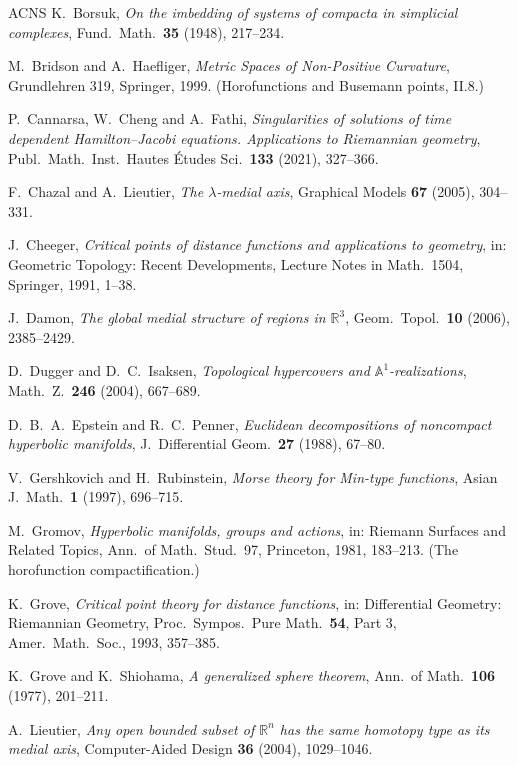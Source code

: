 \documentclass[11pt]{article}
\theoremstyle{remark}
\newcommand{\R}{\mathbb{R}}
\begin{document}
\begin{thebibliography}{ACNS}
 K.~Borsuk, \emph{On the imbedding of systems of
compacta in simplicial complexes}, Fund.\ Math.\ \textbf{35}
(1948), 217--234.

 M.~Bridson and A.~Haefliger, \emph{Metric Spaces of
Non-Positive Curvature}, Grundlehren 319, Springer, 1999.
(Horofunctions and Busemann points, II.8.)

 P.~Cannarsa, W.~Cheng and A.~Fathi, \emph{Singularities
of solutions of time dependent Hamilton--Jacobi equations.
Applications to Riemannian geometry}, Publ.\ Math.\ Inst.\ Hautes
\'Etudes Sci.\ \textbf{133} (2021), 327--366.

 F.~Chazal and A.~Lieutier, \emph{The
$\lambda$-medial axis}, Graphical Models \textbf{67} (2005),
304--331.

 J.~Cheeger, \emph{Critical points of distance
functions and applications to geometry}, in: Geometric Topology:
Recent Developments, Lecture Notes in Math.\ 1504, Springer, 1991,
1--38.

 J.~Damon, \emph{The global medial structure of
regions in $\R^{3}$}, Geom.\ Topol.\ \textbf{10} (2006),
2385--2429.

 D.~Dugger and D.~C.~Isaksen, \emph{Topological
hypercovers and $\mathbb{A}^{1}$-realizations}, Math.\ Z.\
\textbf{246} (2004), 667--689.

 D.~B.~A.~Epstein and R.~C.~Penner, \emph{Euclidean
decompositions of noncompact hyperbolic manifolds}, J.\
Differential Geom.\ \textbf{27} (1988), 67--80.

 V.~Gershkovich and H.~Rubinstein, \emph{Morse theory
for Min-type functions}, Asian J.\ Math.\ \textbf{1} (1997),
696--715.

 M.~Gromov, \emph{Hyperbolic manifolds, groups and
actions}, in: Riemann Surfaces and Related Topics, Ann.\ of Math.\
Stud.\ 97, Princeton, 1981, 183--213. (The horofunction
compactification.)

\bibitem{Grv} K.~Grove, \emph{Critical point theory for distance
functions}, in: Differential Geometry: Riemannian Geometry, Proc.\
Sympos.\ Pure Math.\ \textbf{54}, Part 3, Amer.\ Math.\ Soc.,
1993, 357--385.

\bibitem{GS} K.~Grove and K.~Shiohama, \emph{A generalized sphere
theorem}, Ann.\ of Math.\ \textbf{106} (1977), 201--211.

 A.~Lieutier, \emph{Any open bounded subset of $\R^{n}$
has the same homotopy type as its medial axis}, Computer-Aided Design
\textbf{36} (2004), 1029--1046.


\end{thebibliography}
\end{document}

